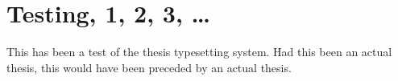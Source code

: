 \documentclass[ms,testing]{nuthesis}
\begin{document}
\appendix

\chapter{Testing, 1, 2, 3, \ldots}

This has been a test of the thesis typesetting system.
Had this been an actual thesis, this would have been
preceded by an actual thesis.



\nocite{*}

\end{document}
